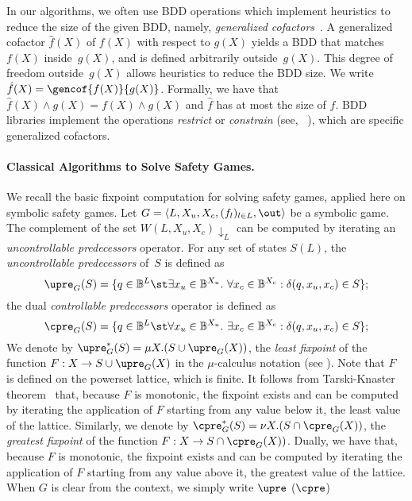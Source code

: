 \documentclass[submission,copyright,creativecommons]{eptcs}
\begin{document}
In our algorithms, we often use BDD operations which implement heuristics to
reduce the size of the given BDD\@,
namely, \emph{generalized cofactors}~\cite{tslbs-v90,shs-vb94}. 
A generalized
cofactor $\hat{f}(X)$ of $f(X)$ with respect to $g(X)$ yields a BDD 
that matches~$f(X)$ inside~$g(X)$, and is defined arbitrarily outside~$g(X)$.
This degree of freedom outside~$g(X)$ allows heuristics to reduce the BDD size.
We write $\hat{f}(X) = \gencof{f(X)}{g(X)}$. Formally, we have that $\hat{f}(X) \land g(X)
= f(X) \land g(X)$ and $\hat{f}$ has at most the size of $f$. BDD libraries
implement the operations \emph{restrict} or \emph{constrain} (see,
\eg~\cite{somenzi99}), which are specific generalized cofactors.

\paragraph{Classical Algorithms to Solve Safety Games.}
We recall the basic fixpoint computation for solving safety games, applied here
on symbolic safety games.  Let $G = \langle L, X_u, X_c, (f_l)_{l\in
L},\out \rangle$ be a symbolic game.
The complement of the set $W(L,X_u,X_c)\downarrow_L$ can be computed by
iterating an \emph{uncontrollable predecessors} operator.  For any set of states
$S(L)$, the \emph{uncontrollable predecessors} of~$S$ is defined as
\[
	\upre_G(S) = \{q \in \mathbb{B}^L \st 
		\exists x_u \in \mathbb{B}^{X_u}.\
		\forall x_c \in \mathbb{B}^{X_c} :
		\delta(q, x_u, x_c) \in S\};
\]
the dual \emph{controllable predecessors} operator is defined as
\[
	\cpre_G(S) = \{q \in \mathbb{B}^L \st 
		\forall x_u \in \mathbb{B}^{X_u}.\
		\exists x_c \in \mathbb{B}^{X_c} :
		\delta(q, x_u, x_c) \in S\};
\]
We denote by $\upre_G^*(S) = \mu X. (S \cup \upre_G(X))$, the \emph{least
fixpoint} of the function $F : X \to S \cup \upre_G(X)$ in the $\mu$-calculus
notation (see \cite{ej91}). Note that $F$ is defined on the powerset lattice,
which is finite. It follows from Tarski-Knaster theorem~\cite{tarski55} that,
because $F$ is monotonic, the fixpoint exists and can be computed by iterating
the application of $F$ starting from any value below it, \eg the least value of
the lattice. Similarly, we denote by $\cpre_G^*(S) = \nu X. (S \cap
\cpre_G(X))$, the \emph{greatest fixpoint} of the function $F : X \to S \cap
\cpre_G(X))$. Dually, we have that, because $F$ is monotonic, the fixpoint
exists and can be computed by iterating the application of $F$ starting from any
value above it, \eg the greatest value of the lattice.
When $G$ is clear from the context, we simply write $\upre$ ($\cpre$)
\end{document}
